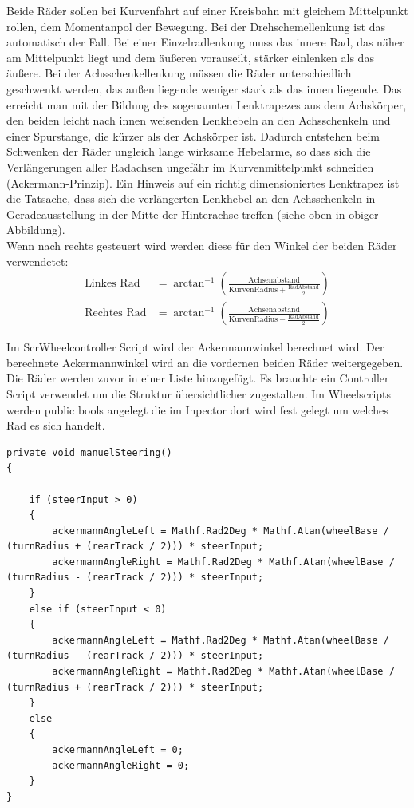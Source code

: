 Beide Räder sollen bei Kurvenfahrt auf einer Kreisbahn mit gleichem Mittelpunkt rollen, dem Momentanpol der Bewegung. Bei der Drehschemellenkung ist das automatisch der Fall. Bei einer Einzelradlenkung muss das innere Rad, das näher am Mittelpunkt liegt und dem äußeren vorauseilt, stärker einlenken als das äußere. Bei der Achsschenkellenkung müssen die Räder unterschiedlich geschwenkt werden, das außen liegende weniger stark als das innen liegende. Das erreicht man mit der Bildung des sogenannten Lenktrapezes aus dem Achskörper, den beiden leicht nach innen weisenden Lenkhebeln an den Achsschenkeln und einer Spurstange, die kürzer als der Achskörper ist. Dadurch entstehen beim Schwenken der Räder ungleich lange wirksame Hebelarme, so dass sich die Verlängerungen aller Radachsen ungefähr im Kurvenmittelpunkt schneiden (Ackermann-Prinzip). Ein Hinweis auf ein richtig dimensioniertes Lenktrapez ist die Tatsache, dass sich die verlängerten Lenkhebel an den Achsschenkeln in Geradeausstellung in der Mitte der Hinterachse treffen (siehe oben in obiger Abbildung).\\

Wenn nach rechts gesteuert wird werden diese für den Winkel der beiden Räder verwendetet:
\begin{align}
    \textrm{Linkes Rad}& =\arctan^{-1}\left(\frac{\textrm{Achsenabstand}}{\textrm{KurvenRadius}+\frac{\textrm{RadAbstand}}{2}}\right)\\
    \textrm{Rechtes Rad}& =\arctan^{-1}\left(\frac{\textrm{Achsenabstand}}{\textrm{KurvenRadius}-\frac{\textrm{RadAbstand}}{2}}\right) 
\end{align}

Im ScrWheelcontroller Script wird der Ackermannwinkel berechnet wird. Der berechnete Ackermannwinkel wird an die vordernen beiden Räder weitergegeben. Die Räder werden zuvor in einer Liste hinzugefügt.
Es brauchte ein Controller Script verwendet um die Struktur übersichtlicher zugestalten. Im Wheelscripts werden public bools angelegt die im Inpector dort wird fest gelegt um welches Rad es sich handelt.


\begin{lstlisting}
private void manuelSteering()
{
            
    if (steerInput > 0)
    {
        ackermannAngleLeft = Mathf.Rad2Deg * Mathf.Atan(wheelBase / (turnRadius + (rearTrack / 2))) * steerInput;
        ackermannAngleRight = Mathf.Rad2Deg * Mathf.Atan(wheelBase / (turnRadius - (rearTrack / 2))) * steerInput;
    }
    else if (steerInput < 0)
    {
        ackermannAngleLeft = Mathf.Rad2Deg * Mathf.Atan(wheelBase / (turnRadius - (rearTrack / 2))) * steerInput;
        ackermannAngleRight = Mathf.Rad2Deg * Mathf.Atan(wheelBase / (turnRadius + (rearTrack / 2))) * steerInput;
    }
    else
    {
        ackermannAngleLeft = 0;
        ackermannAngleRight = 0;
    }
}    
\end{lstlisting}


